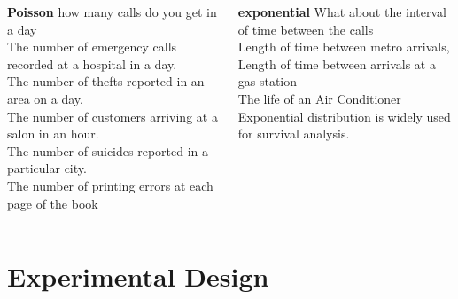 \documentclass{beamer}
\begin{document}
\begin{frame}%
\begin{columns}
	\begin{column}{0.45\textwidth}
		\textbf{Poisson}
		how many calls do you get in a day
		\\ The number of emergency calls recorded at a hospital in a day.
		\\ The number of thefts reported in an area on a day.
		\\ The number of customers arriving at a salon in an hour.
		\\ The number of suicides reported in a particular city.
		\\ The number of printing errors at each page of the book
	\end{column}
	\begin{column}{0.45\textwidth}
		\textbf{exponential}
		What about the interval of time between the calls
		\\ Length of time between metro arrivals,
		\\ Length of time between arrivals at a gas station
		\\ The life of an Air Conditioner
		\\Exponential distribution is widely used for survival analysis. 
	\end{column}
\end{columns}
\end{frame}






\section{Experimental Design}
\end{document}
